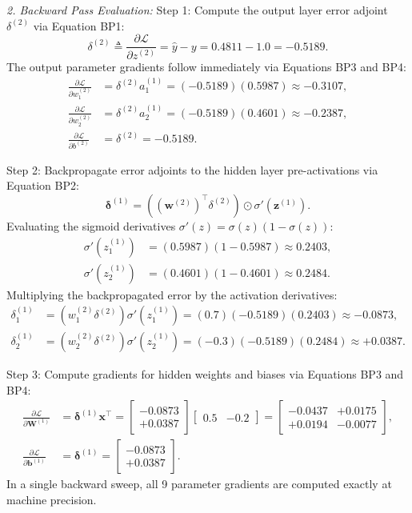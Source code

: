 \textit{2. Backward Pass Evaluation:}
Step 1: Compute the output layer error adjoint $\delta^{(2)}$ via Equation BP1:
\begin{equation}
\delta^{(2)} \triangleq \frac{\partial \mathcal{L}}{\partial z^{(2)}} = \hat{y} - y = 0.4811 - 1.0 = -0.5189.
\end{equation}
The output parameter gradients follow immediately via Equations BP3 and BP4:
\begin{align}
\frac{\partial \mathcal{L}}{\partial w_1^{(2)}} &= \delta^{(2)} a_1^{(1)} = (-0.5189)(0.5987) \approx -0.3107, \nonumber \\
\frac{\partial \mathcal{L}}{\partial w_2^{(2)}} &= \delta^{(2)} a_2^{(1)} = (-0.5189)(0.4601) \approx -0.2387, \nonumber \\
\frac{\partial \mathcal{L}}{\partial b^{(2)}} &= \delta^{(2)} = -0.5189.
\end{align}

Step 2: Backpropagate error adjoints to the hidden layer pre-activations via Equation BP2:
\begin{equation}
\boldsymbol{\delta}^{(1)} = \left( (\mathbf{w}^{(2)})^\top \delta^{(2)} \right) \odot \sigma'(\mathbf{z}^{(1)}).
\end{equation}
Evaluating the sigmoid derivatives $\sigma'(z) = \sigma(z)(1 - \sigma(z))$:
\begin{align}
\sigma'(z_1^{(1)}) &= (0.5987)(1 - 0.5987) \approx 0.2403, \nonumber \\
\sigma'(z_2^{(1)}) &= (0.4601)(1 - 0.4601) \approx 0.2484.
\end{align}
Multiplying the backpropagated error by the activation derivatives:
\begin{align}
\delta_1^{(1)} &= (w_1^{(2)} \delta^{(2)}) \sigma'(z_1^{(1)}) = (0.7)(-0.5189)(0.2403) \approx -0.0873, \nonumber \\
\delta_2^{(1)} &= (w_2^{(2)} \delta^{(2)}) \sigma'(z_2^{(1)}) = (-0.3)(-0.5189)(0.2484) \approx +0.0387.
\end{align}

Step 3: Compute gradients for hidden weights and biases via Equations BP3 and BP4:
\begin{align}
\frac{\partial \mathcal{L}}{\partial \mathbf{W}^{(1)}} &= \boldsymbol{\delta}^{(1)} \mathbf{x}^\top = \begin{bmatrix} -0.0873 \\ +0.0387 \end{bmatrix} \begin{bmatrix} 0.5 & -0.2 \end{bmatrix} = \begin{bmatrix} -0.0437 & +0.0175 \\ +0.0194 & -0.0077 \end{bmatrix}, \nonumber \\
\frac{\partial \mathcal{L}}{\partial \mathbf{b}^{(1)}} &= \boldsymbol{\delta}^{(1)} = \begin{bmatrix} -0.0873 \\ +0.0387 \end{bmatrix}.
\end{align}
In a single backward sweep, all 9 parameter gradients are computed exactly at machine precision.


